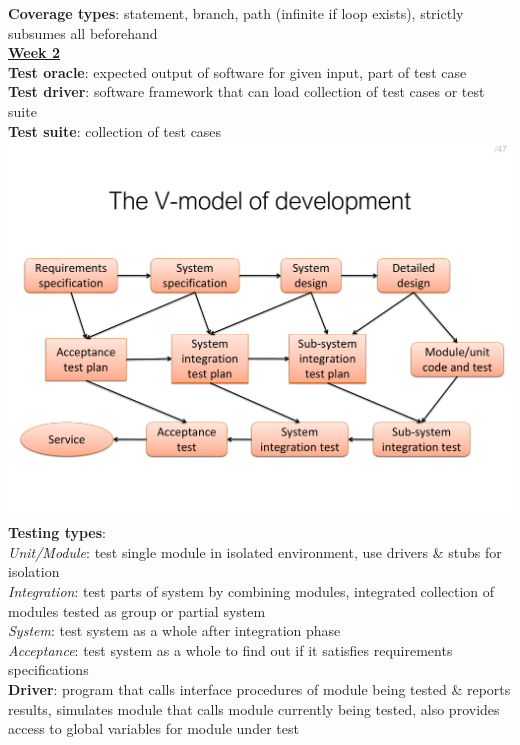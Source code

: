 \documentclass[a4paper]{article}
\begin{document}
\begin{multicols}{3}
        \textbf{Coverage types}: statement, branch, path (infinite if loop exists), strictly subsumes all beforehand\\
        \vfill\null\columnbreak\noindent\underline{\textbf{Week 2}}\\
        \textbf{Test oracle}: expected output of software for given input, part of test case\\
        \textbf{Test driver}: software framework that can load collection of test cases or test suite\\
        \textbf{Test suite}: collection of test cases\\
        \includegraphics[width=\linewidth]{96.pdf}\\
        \textbf{Testing types}:\\
        \textit{Unit/Module}: test single module in isolated environment, use drivers \& stubs for isolation\\
        \textit{Integration}: test parts of system by combining modules, integrated collection of modules tested as group or partial system\\
        \textit{System}: test system as a whole after integration phase\\
        \textit{Acceptance}: test system as a whole to find out if it satisfies requirements specifications\\
        \textbf{Driver}: program that calls interface procedures of module being tested \& reports results, simulates module that calls module currently being tested, also provides access to global variables for module under test\\

\end{multicols}
\end{document}
